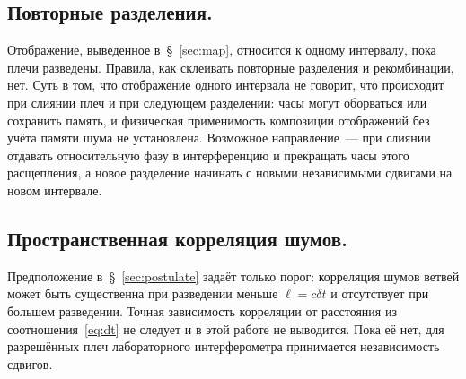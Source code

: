 \documentclass[12pt,a4paper]{article}
\begin{document}
\subsection{Повторные разделения.}
\label{sec:open_repeat}
Отображение, выведенное в~\S~\ref{sec:map}, относится к одному интервалу, пока плечи разведены. Правила, как склеивать повторные разделения и рекомбинации, нет. Суть в том, что отображение одного интервала не говорит, что происходит при слиянии плеч и при следующем разделении: часы могут оборваться или сохранить память, и физическая применимость композиции отображений без учёта памяти шума не установлена. Возможное направление~--- при слиянии отдавать относительную фазу в интерференцию и прекращать часы этого расщепления, а новое разделение начинать с новыми независимыми сдвигами на новом интервале.

\subsection{Пространственная корреляция шумов.}
\label{sec:open_corr}
Предположение в~\S~\ref{sec:postulate} задаёт только порог: корреляция шумов ветвей может быть существенна при разведении меньше $\ell=c\delta t$ и отсутствует при большем разведении. Точная зависимость корреляции от расстояния из соотношения~\eqref{eq:dt} не следует и в этой работе не выводится. Пока её нет, для разрешённых плеч лабораторного интерферометра принимается независимость сдвигов.



\end{document}
